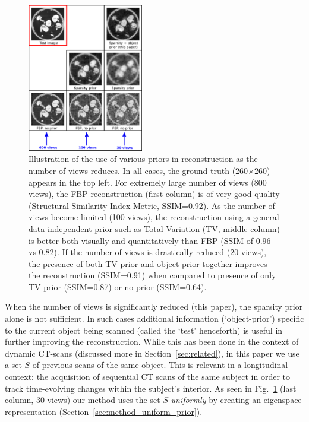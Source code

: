 \documentclass[journal]{IEEEtran}
\begin{document}
 \begin{figure}[t]
\centering
	\includegraphics[width=0.45\textwidth]{../images/story/story.png}
        \caption{Illustration of the use of various priors in 
          reconstruction as the number of views reduces. In all cases,
          the ground truth (260$\times$260) appears in the top left.
          For extremely large number of views (800 views), the FBP
          reconstruction (first column) is of very good quality
          (Structural Similarity Index Metric, SSIM=0.92). As the
          number of views become limited (100 views), the
          reconstruction using a general data-independent prior such as Total Variation (TV, middle column) is
          better both visually and quantitatively than FBP (SSIM of
          0.96 vs 0.82). If the number of views is drastically reduced
          (20 views), the presence of both TV prior and object
          prior together improves the reconstruction (SSIM=0.91) when compared
          to presence of only TV prior (SSIM=0.87) or no prior
          (SSIM=0.64).}
 \label{fig:story}
 \end{figure} 

 When the number of views is significantly reduced (this paper), the
 sparsity prior alone is not sufficient.  In such cases additional
 information (`object-prior') specific to the current
 object being scanned (called the `test' henceforth) is useful in
 further improving the reconstruction.  While this has been done in
 the context of dynamic CT-scans (discussed more in
 Section~\ref{sec:related}), in this paper we use a set $S$ of
 previous scans of the same object. This is relevant in a longitudinal
 context: the acquisition of sequential CT scans of the same subject
 in order to track time-evolving changes within the subject's
 interior. As seen in Fig.~\ref{fig:story} (last column, 30 views) our
 method uses the set $S$ \emph{uniformly} by creating an
 eigenspace representation (Section~\ref{sec:method_uniform_prior}).
\end{document}
